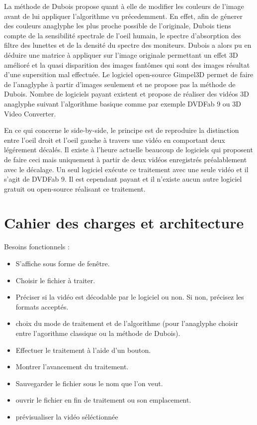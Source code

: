 \documentclass[10pt,a4paper]{article}
\begin{document}
La méthode de Dubois propose quant à elle de modifier les couleurs de l'image avant de lui appliquer l'algorithme vu précedemment.
En effet, afin de génerer des couleurs anaglyphe les plus proche possible de l'originale, Dubois tiens compte de la sensibilité spectrale de l'oeil humain,
le spectre d'absorption des filtre des lunettes et de la densité du spectre des moniteurs.
Dubois a alors pu en déduire une matrice à appliquer sur l'image originale permettant un effet 3D amélioré et la quasi
disparition des images fantômes qui sont des images résultat d'une supersition mal effectuée.
Le logiciel open-source Gimpel3D permet de faire de l'anaglyphe à partir d'images seulement et ne propose pas la méthode de Dubois. Nombre de logiciels payant existent et propose de réaliser des vidéos 3D
anaglyphe suivant l'algorithme basique comme par exemple DVDFab 9 ou  3D Video Converter.\newline

En ce qui concerne le side-by-side, le principe est de reproduire la distinction entre l'oeil droit et l'oeil gauche à travers une vidéo en comportant deux légérement décalés.
Il existe à l'heure actuelle beaucoup de logiciels qui proposent de faire ceci mais uniquement à partir de deux vidéos enregistrés préalablement avec le décalage.
Un seul logiciel exécute ce traitement avec une seule vidéo et il s'agit de DVDFab 9. Il est cependant payant et il n'existe aucun autre logiciel gratuit ou open-source réalisant ce traitement.

\section{Cahier des charges et architecture}

Besoins fonctionnels :\newline
\begin{itemize}
\item S'affiche sous forme de fenêtre.
\item Choisir le fichier à traiter.
\item Préciser si la vidéo est décodable par le logiciel ou non. Si non, précisez les formats acceptés.
\item choix du mode de traitement et de l'algorithme (pour l'anaglyphe choisir entre l'agorithme classique ou la méthode
de Dubois).
\item Effectuer le traitement à l'aide d'un bouton.
\item Montrer l'avancement du traitement.
\item Sauvegarder le fichier sous le nom que l'on veut.
\item ouvrir le fichier en fin de traitement ou son emplacement.
\item prévisualiser la vidéo séléctionnée\newline
\end{itemize}
\end{document}

